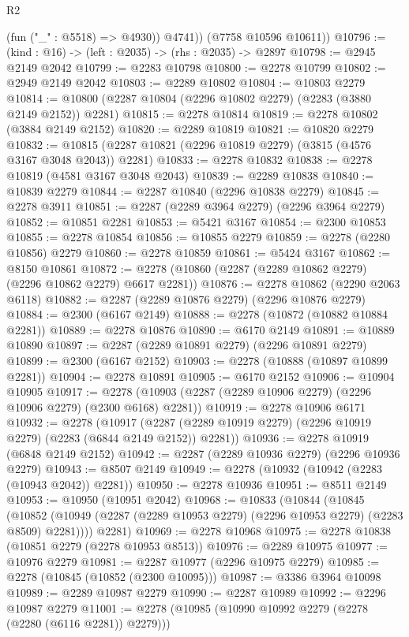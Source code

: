 \begin{lexlean}{R2}
\begin{coremodule}
            (fun ("_" : @5518) => @4930))
          @4741))
      (@7758 @10596 @10611))
@10796 := (kind : @16) -> (left : @2035) -> (rhs : @2035) -> @2897
@10798 := @2945 @2149 @2042
@10799 := @2283 @10798
@10800 := @2278 @10799
@10802 := @2949 @2149 @2042
@10803 := @2289 @10802
@10804 := @10803 @2279
@10814 := @10800 (@2287 @10804 (@2296 @10802 @2279) (@2283 (@3880 @2149 @2152)) @2281)
@10815 := @2278 @10814
@10819 := @2278 @10802 (@3884 @2149 @2152)
@10820 := @2289 @10819
@10821 := @10820 @2279
@10832 := @10815 (@2287 @10821 (@2296 @10819 @2279) (@3815 (@4576 @3167 @3048 @2043)) @2281)
@10833 := @2278 @10832
@10838 := @2278 @10819 (@4581 @3167 @3048 @2043)
@10839 := @2289 @10838
@10840 := @10839 @2279
@10844 := @2287 @10840 (@2296 @10838 @2279)
@10845 := @2278 @3911
@10851 := @2287 (@2289 @3964 @2279) (@2296 @3964 @2279)
@10852 := @10851 @2281
@10853 := @5421 @3167
@10854 := @2300 @10853
@10855 := @2278 @10854
@10856 := @10855 @2279
@10859 := @2278 (@2280 @10856) @2279
@10860 := @2278 @10859
@10861 := @5424 @3167
@10862 := @8150 @10861
@10872 := @2278 (@10860 (@2287 (@2289 @10862 @2279) (@2296 @10862 @2279) @6617 @2281))
@10876 := @2278 @10862 (@2290 @2063 @6118)
@10882 := @2287 (@2289 @10876 @2279) (@2296 @10876 @2279)
@10884 := @2300 (@6167 @2149)
@10888 := @2278 (@10872 (@10882 @10884 @2281))
@10889 := @2278 @10876
@10890 := @6170 @2149
@10891 := @10889 @10890
@10897 := @2287 (@2289 @10891 @2279) (@2296 @10891 @2279)
@10899 := @2300 (@6167 @2152)
@10903 := @2278 (@10888 (@10897 @10899 @2281))
@10904 := @2278 @10891
@10905 := @6170 @2152
@10906 := @10904 @10905
@10917 := @2278 (@10903 (@2287 (@2289 @10906 @2279) (@2296 @10906 @2279) (@2300 @6168) @2281))
@10919 := @2278 @10906 @6171
@10932 := @2278
    (@10917 (@2287 (@2289 @10919 @2279) (@2296 @10919 @2279) (@2283 (@6844 @2149 @2152)) @2281))
@10936 := @2278 @10919 (@6848 @2149 @2152)
@10942 := @2287 (@2289 @10936 @2279) (@2296 @10936 @2279)
@10943 := @8507 @2149
@10949 := @2278 (@10932 (@10942 (@2283 (@10943 @2042)) @2281))
@10950 := @2278 @10936
@10951 := @8511 @2149
@10953 := @10950 (@10951 @2042)
@10968 := @10833
    (@10844
      (@10845
        (@10852 (@10949 (@2287 (@2289 @10953 @2279) (@2296 @10953 @2279) (@2283 @8509) @2281))))
      @2281)
@10969 := @2278 @10968
@10975 := @2278 @10838 (@10851 @2279 (@2278 @10953 @8513))
@10976 := @2289 @10975
@10977 := @10976 @2279
@10981 := @2287 @10977 (@2296 @10975 @2279)
@10985 := @2278 (@10845 (@10852 (@2300 @10095)))
@10987 := @3386 @3964 @10098
@10989 := @2289 @10987 @2279
@10990 := @2287 @10989
@10992 := @2296 @10987 @2279
@11001 := @2278 (@10985 (@10990 @10992 @2279 (@2278 (@2280 (@6116 @2281)) @2279)))

\end{coremodule}
\end{lexlean}

